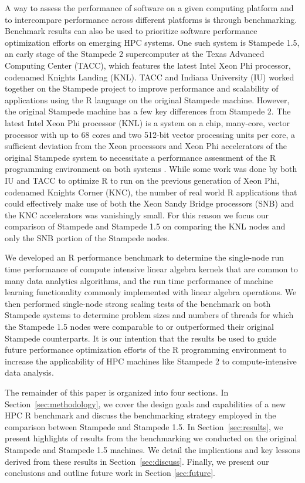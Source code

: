 A way to assess the performance of software on a given computing platform and to intercompare
performance across different platforms is through benchmarking. Benchmark results can also
be used to prioritize software performance optimization efforts on emerging HPC systems.
One such system is Stampede 1.5, an early stage of the Stampede 2 supercomputer at the
Texas Advanced Computing Center (TACC), which features the latest Intel Xeon Phi processor,
codenamed Knights Landing (KNL). TACC and Indiana University (IU) worked together on the Stampede project to
improve performance and scalability of applications using the R language on the original
Stampede machine. However, the original Stampede machine has a few key differences from
Stampede 2. The latest Intel Xeon Phi processor (KNL) is a system on a chip, many-core, vector processor
with up to 68 cores and two 512-bit vector processing units per core, a sufficient
deviation from the Xeon processors and Xeon Phi accelerators of the original
Stampede system to necessitate a performance assessment of the R programming environment
on both systems \cite{tacc:stampedeGuide}. While some work was done by both IU and TACC to
optimize R to run on the previous generation of Xeon Phi\cite{zou:2014high}, codenamed
Knights Corner (KNC), the number of real world R applications that could effectively make
use of both the Xeon Sandy Bridge processors (SNB) and the KNC accelerators was vanishingly
small. For this reason we focus our comparison of Stampede and Stampede 1.5 on comparing the
KNL nodes and only the SNB portion of the Stampede nodes.

We developed an R performance benchmark to determine the single-node run time performance
of compute intensive linear algebra kernels that are common to many data analytics
algorithms, and the run time performance of machine learning functionality commonly
implemented with linear algebra operations.  We then performed single-node strong scaling
tests of the benchmark on both Stampede systems to determine problem sizes and numbers of
threads for which the Stampede 1.5 nodes were comparable to or outperformed their original
Stampede counterparts.  It is our intention that the results be used to guide future
performance optimization efforts of the R programming environment to increase the
applicability of HPC machines like Stampede 2 to compute-intensive data
analysis.

The remainder of this paper is organized into four sections.  In Section~\ref{sec:methodology},
we cover the design goals and capabilities of a new HPC R benchmark and discuss the
benchmarking strategy employed in the comparison between Stampede and Stampede 1.5.
In Section~\ref{sec:results}, we present highlights of results from the benchmarking we
conducted on the original Stampede and Stampede 1.5 machines.  We detail the implications
and key lessons derived from these results in Section~\ref{sec:discuss}.  Finally, we present our
conclusions and outline future work in Section \ref{sec:future}.


